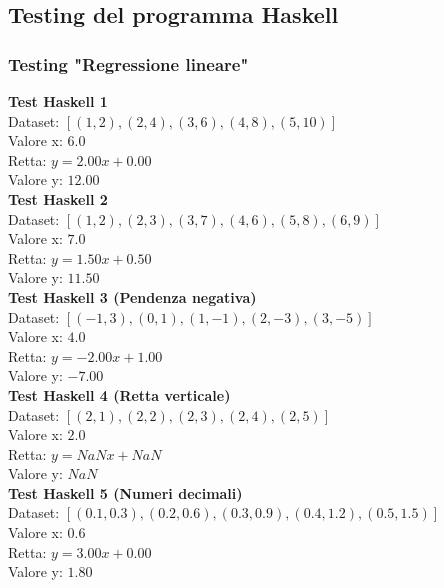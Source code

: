 \documentclass[11pt]{article}
\theoremstyle{definition}
\begin{document}
\subsection{Testing del programma Haskell}
\subsubsection{Testing "Regressione lineare"}
\noindent
\textbf{Test Haskell 1}\\
Dataset: $[(1, 2), (2, 4), (3, 6), (4, 8), (5, 10)]$\\
Valore x: $6.0$\\
Retta: $y = 2.00x + 0.00$\\
Valore y: $12.00$\\
\newline
\textbf{Test Haskell 2}\\
Dataset: $[(1, 2), (2, 3), (3, 7), (4, 6), (5, 8), (6, 9)]$\\
Valore x: $7.0$\\
Retta: $y = 1.50x + 0.50$\\
Valore y: $11.50$\\
\newline
\textbf{Test Haskell 3 (Pendenza negativa)}\\
Dataset: $[(-1, 3), (0, 1), (1, -1), (2, -3), (3, -5)]$\\
Valore x: $4.0$\\
Retta: $y = -2.00x + 1.00$\\
Valore y: $-7.00$\\
\newline
\textbf{Test Haskell 4 (Retta verticale)}\\
Dataset: $[(2, 1), (2, 2), (2, 3), (2, 4), (2, 5)]$\\
Valore x: $2.0$\\
Retta: $y = NaNx + NaN$\\
Valore y: $NaN$\\
\newline
\textbf{Test Haskell 5 (Numeri decimali)}\\
Dataset: $[(0.1, 0.3), (0.2, 0.6), (0.3, 0.9), (0.4, 1.2), (0.5, 1.5)]$\\
Valore x: $0.6$\\
Retta: $y = 3.00x + 0.00$\\
Valore y: $1.80$
\end{document}
